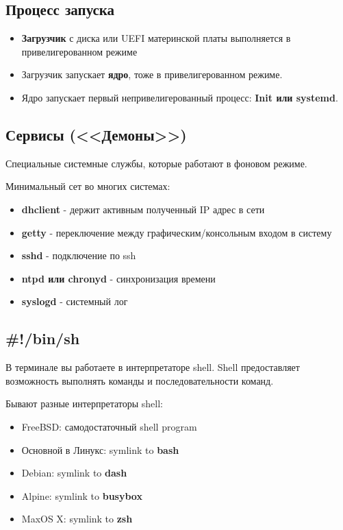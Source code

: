\subsection{Процесс запуска}

\begin{itemize}
	\item \textbf{Загрузчик} с диска или UEFI материнской платы выполняется в привелигерованном режиме
	\item Загрузчик запускает \textbf{ядро}, тоже в привелигерованном режиме.
	\item Ядро запускает первый непривелигерованный процесс: \textbf{Init или systemd}.
\end{itemize}

\subsection{Сервисы (<<Демоны>>)}

Специальные системные службы, которые работают в фоновом режиме.

Минимальный сет во многих системах:
\begin{itemize}
	\item \textbf{dhclient} - держит активным полученный IP адрес в сети
	\item \textbf{getty} - переключение между графическим/консольным входом в систему
	\item \textbf{sshd} - подключение по ssh
	\item \textbf{ntpd или chronyd} - синхронизация времени
	\item \textbf{syslogd} - системный лог
\end{itemize}

\subsection{\#!/bin/sh}

В терминале вы работаете в интерпретаторе shell. Shell предоставляет возможность выполнять
команды и последовательности команд.

Бывают разные интерпретаторы shell:
\begin{itemize}
	\item FreeBSD: самодостаточный shell program
	\item Основной в Линукс: symlink to \textbf{bash}
	\item Debian: symlink to \textbf{dash}
	\item Alpine: symlink to \textbf{busybox}
	\item MaxOS X: symlink to \textbf{zsh}
\end{itemize}

